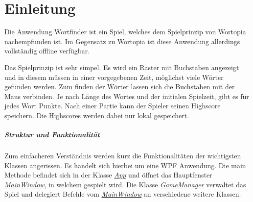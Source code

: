 \chapter{Einleitung}

Die Anwendung \glqq Wortfinder\grqq{} ist ein Spiel, welches dem Spielprinzip von Wortopia nachempfunden ist. Im Gegensatz zu Wortopia ist diese Anwendung allerdings vollständig offline verfügbar.

Das Spielprinzip ist sehr simpel. Es wird ein Raster mit Buchstaben angezeigt und in diesem müssen in einer vorgegebenen Zeit, möglichst viele Wörter gefunden werden. Zum finden der Wörter lassen sich die Buchstaben mit der Maus verbinden. Je nach Länge des Wortes und der initialen Spielzeit, gibt es für jedes Wort Punkte. Nach einer Partie kann der Spieler seinen Highscore speichern. Die Highscores werden dabei nur lokal gespeichert.


\paragraph{Struktur und Funktionalität}
Zum einfacheren Verständnis werden kurz die Funktionalitäten der wichtigsten Klassen angerissen. Es handelt sich hierbei um eine WPF Anwendung. Die main Methode befindet sich in der Klasse \href{https://github.com/EinToni/Wortfinder/blob/main/Wortfinder/App.xaml.cs}{\textit{App}} und öffnet das Hauptfenster \href{https://github.com/EinToni/Wortfinder/blob/main/Wortfinder/MainWindow.xaml.cs}{\textit{MainWindow}}, in welchem gespielt wird. Die Klasse \href{https://github.com/EinToni/Wortfinder/blob/main/Wortfinder/GameManager.cs}{\textit{GameManager}} verwaltet das Spiel und delegiert Befehle vom \href{https://github.com/EinToni/Wortfinder/blob/main/Wortfinder/MainWindow.xaml.cs}{\textit{MainWindow}} an verschiedene weitere Klassen.


